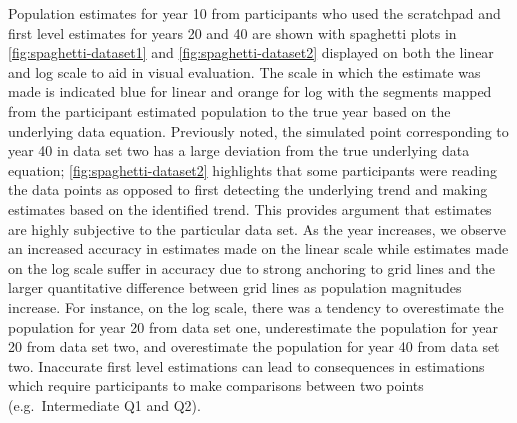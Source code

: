 \documentclass[print]{nuthesis}
\begin{document}
Population estimates for year 10 from participants who used the scratchpad and first level estimates for years 20 and 40 are shown with spaghetti plots in \cref{fig:spaghetti-dataset1} and \cref{fig:spaghetti-dataset2} displayed on both the linear and log scale to aid in visual evaluation.
The scale in which the estimate was made is indicated blue for linear and orange for log with the segments mapped from the participant estimated population to the true year based on the underlying data equation.
Previously noted, the simulated point corresponding to year 40 in data set two has a large deviation from the true underlying data equation; \cref{fig:spaghetti-dataset2} highlights that some participants were reading the data points as opposed to first detecting the underlying trend and making estimates based on the identified trend.
This provides argument that estimates are highly subjective to the particular data set.
As the year increases, we observe an increased accuracy in estimates made on the linear scale while estimates made on the log scale suffer in accuracy due to strong anchoring to grid lines and the larger quantitative difference between grid lines as population magnitudes increase.
For instance, on the log scale, there was a tendency to overestimate the population for year 20 from data set one, underestimate the population for year 20 from data set two, and overestimate the population for year 40 from data set two.
Inaccurate first level estimations can lead to consequences in estimations which require participants to make comparisons between two points (e.g.~Intermediate Q1 and Q2).
\end{document}
